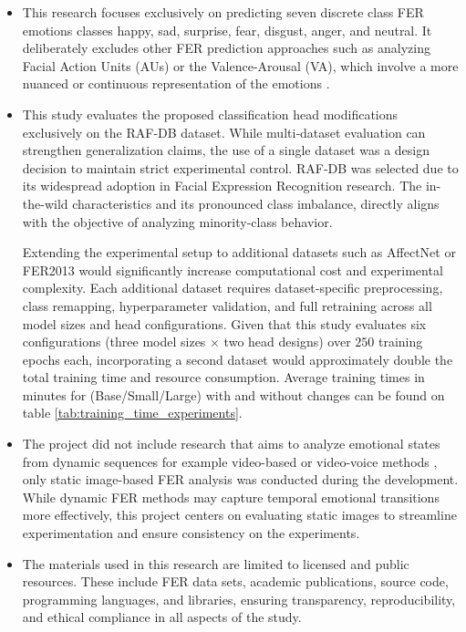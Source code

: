 \begin{itemize}
\item This research focuses exclusively on predicting seven discrete class FER emotions classes happy, sad, surprise, fear, disgust, anger, and neutral. It deliberately excludes other FER prediction approaches such as analyzing Facial Action Units (AUs) or the Valence-Arousal (VA), which involve a more nuanced or continuous representation of the emotions \cite{mollahosseini_affectnet_2019, kollias_affect_2021}.

\item This study evaluates the proposed classification head modifications exclusively on the RAF‑DB dataset. While multi‑dataset evaluation can strengthen generalization claims, the use of a single dataset was a design decision to maintain strict experimental control. RAF‑DB was selected due to its widespread adoption in Facial Expression Recognition research. The \gls{in-the-wild} characteristics and its pronounced class imbalance, directly aligns with the objective of analyzing minority-class behavior.

Extending the experimental setup to additional datasets such as AffectNet \cite{mollahosseini_affectnet_2019} or FER2013 \cite{khaireddin_facial_2021} would significantly increase computational cost and experimental complexity. Each additional dataset requires dataset‑specific preprocessing, class remapping, hyperparameter validation, and full retraining across all model sizes and head configurations. Given that this study evaluates six configurations (three model sizes $\times$ two head designs) over $250$ training epochs each, incorporating a second dataset would approximately double the total training time and resource consumption. Average training times in minutes for (Base/Small/Large) with and without changes can be found on table \ref{tab:training_time_experiments}.

\item The project did not include research that aims to analyze emotional states from dynamic sequences for example video-based or video-voice methods \cite{zhang_transformer-based_2022, wang_survey_2024}, only static image-based FER analysis was conducted during the development. While dynamic FER methods may capture temporal emotional transitions more effectively, this project centers on evaluating static images to streamline experimentation and ensure consistency on the experiments.

\item The materials used in this research are limited to licensed and public resources. These include FER data sets, academic publications, source code, programming languages, and libraries, ensuring transparency, reproducibility, and ethical compliance in all aspects of the study.

\end{itemize}